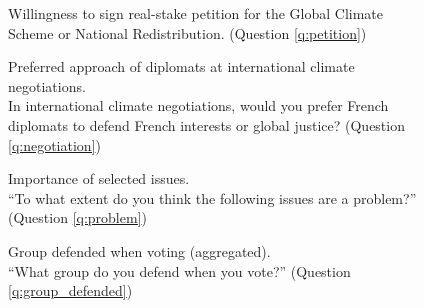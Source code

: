 \documentclass[12pt,english]{article}
\begin{document}
\begin{figure}[h!]
    \caption[Willingness to sign a real-stake petition]{Willingness to sign real-stake petition for the Global Climate Scheme or National Redistribution. (Question \ref{q:petition})}\label{fig:petition}
\end{figure}

\begin{figure}[h!]
    \caption[Preferred approach for international climate negotiations]{Preferred approach of diplomats at international climate negotiations. \\ In international climate negotiations, would you prefer French diplomats to defend French interests or global justice? (Question \ref{q:negotiation})}\label{fig:negotiation}
\end{figure}

\begin{figure}[h!]
    \caption[Importance of selected issues]{Importance of selected issues.\\ ``To what extent do you think the following issues are a problem?'' (Question \ref{q:problem})}\label{fig:problem}
\end{figure}

\begin{figure}[h!]
    \caption[Group defended when voting (aggregated)]{Group defended when voting (aggregated). \\ ``What group do you defend when you vote?'' (Question \ref{q:group_defended})}\label{fig:group_defended}
\end{figure}
\end{document}
